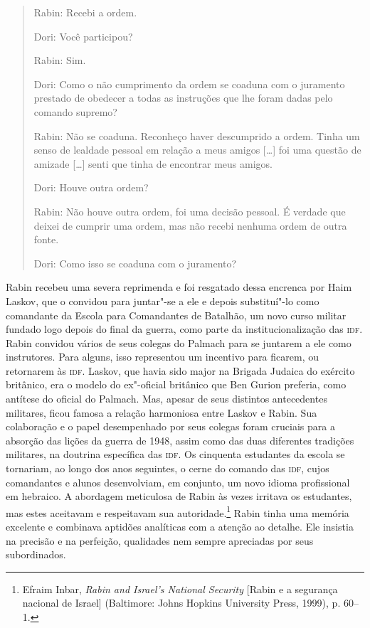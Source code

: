 \begin{quote}

Rabin: Recebi a ordem.

Dori: Você participou?

Rabin: Sim.

Dori: Como o não cumprimento da ordem se coaduna com o juramento
prestado de obedecer a todas as instruções que lhe foram dadas pelo
comando supremo?

Rabin: Não se coaduna. Reconheço haver descumprido a ordem. Tinha um
senso de lealdade pessoal em relação a meus amigos {[}\ldots{}{]} foi uma questão de
amizade {[}\ldots{}{]} senti que tinha de encontrar meus amigos.

Dori: Houve outra ordem?

Rabin: Não houve outra ordem, foi uma decisão pessoal. É verdade que
deixei de cumprir uma ordem, mas não recebi nenhuma ordem de outra
fonte.

Dori: Como isso se coaduna com o juramento?

\end{quote}

Rabin recebeu uma severa reprimenda e foi resgatado dessa encrenca por
Haim Laskov, que o convidou para juntar"-se a ele e depois substituí"-lo
como comandante da Escola para Comandantes de Batalhão, um novo curso
militar fundado logo depois do final da guerra, como parte da
institucionalização das \textsc{idf}. Rabin convidou vários de seus colegas do
Palmach para se juntarem a ele como instrutores. Para alguns, isso representou
um incentivo para ficarem, ou retornarem às \textsc{idf}. Laskov, que havia sido
major na Brigada Judaica do exército britânico, era o modelo do
ex"-oficial britânico que Ben Gurion preferia, como antítese do oficial
do Palmach. Mas, apesar de seus distintos antecedentes militares, ficou
famosa a relação harmoniosa entre Laskov e Rabin. Sua colaboração e o
papel desempenhado por seus colegas foram cruciais para a absorção das
lições da guerra de 1948, assim como das duas diferentes tradições
militares, na doutrina específica das \textsc{idf}. Os cinquenta estudantes da
escola se tornariam, ao longo dos anos seguintes, o cerne do comando das
\textsc{idf}, cujos comandantes e alunos desenvolviam, em conjunto, um novo idioma
profissional em hebraico. A abordagem meticulosa de Rabin às vezes
irritava os estudantes, mas estes aceitavam e respeitavam sua
autoridade.\footnote{Efraim Inbar, \textit{Rabin and Israel's National Security} {[Rabin e a segurança nacional de Israel]} (Baltimore: Johns
Hopkins University Press, 1999), p. 60--1.} Rabin tinha uma memória excelente e combinava
aptidões analíticas com a atenção ao detalhe. Ele insistia na precisão e
na perfeição, qualidades nem sempre apreciadas por seus subordinados.

